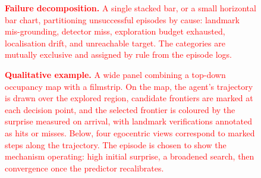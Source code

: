 \textcolor{red}{
\begin{figure}[H]
\centering
\plotbox{4.2cm}
\caption{\textcolor{red}{\textbf{Failure decomposition.} A single stacked bar, or a small horizontal bar chart, partitioning unsuccessful episodes by cause: landmark mis-grounding, detector miss, exploration budget exhausted, localisation drift, and unreachable target. The categories are mutually exclusive and assigned by rule from the episode logs.}}
\label{fig:failure}
\end{figure}
}

\textcolor{red}{
\begin{figure}[t]
\centering
\plotboxw{6.0cm}
\caption{\textcolor{red}{\textbf{Qualitative example.} A wide panel combining a top-down occupancy map with a filmstrip. On the map, the agent's trajectory is drawn over the explored region, candidate frontiers are marked at each decision point, and the selected frontier is coloured by the surprise measured on arrival, with landmark verifications annotated as hits or misses. Below, four egocentric views correspond to marked steps along the trajectory. The episode is chosen to show the mechanism operating: high initial surprise, a broadened search, then convergence once the predictor recalibrates.}}
\label{fig:qualitative}
\end{figure}
}
